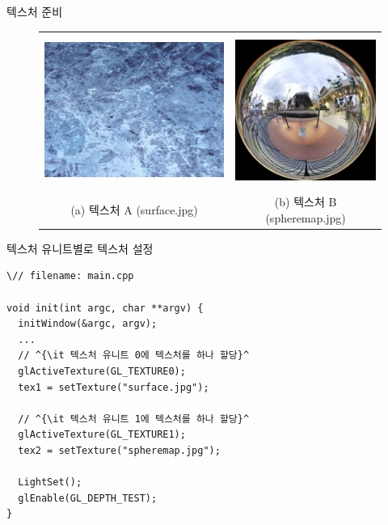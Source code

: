 \documentclass{beamer}
\begin{document}
\begin{frame}[fragile]{텍스처 준비}

\begin{figure}[h!]
  \centering
	\begin{tabular}{cc}
	\includegraphics[height=5cm]{OGL_texture/multiTex_A.png} &
	\includegraphics[height=5cm]{OGL_texture/multiTex_B.png}  \\
	{\sf \small (a) 텍스처 A (surface.jpg)} & {\sf \small (b) 텍스처 B (spheremap.jpg)}
	\end{tabular}
\end{figure}

\end{frame}



\begin{frame}[fragile]{텍스처 유니트별로 텍스처 설정}

\lstset{language=C++, escapechar=^} 
\begin{lstlisting}
\// filename: main.cpp

void init(int argc, char **argv) {
  initWindow(&argc, argv);
  ...
  // ^{\it 텍스처 유니트 0에 텍스처를 하나 할당}^
  glActiveTexture(GL_TEXTURE0);
  tex1 = setTexture("surface.jpg");

  // ^{\it 텍스처 유니트 1에 텍스처를 하나 할당}^
  glActiveTexture(GL_TEXTURE1);
  tex2 = setTexture("spheremap.jpg");

  LightSet();
  glEnable(GL_DEPTH_TEST);
}
\end{lstlisting}

\end{frame}
\end{document}
